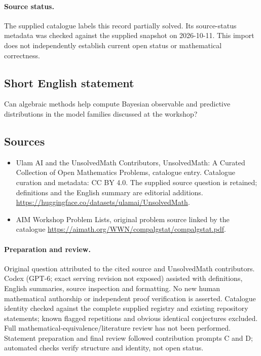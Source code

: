 \documentclass[11pt]{article}
\begin{document}
\paragraph{Source status.}
The supplied catalogue labels this record partially solved. Its source-status metadata was checked against the supplied snapshot on 2026-10-11. This import does not independently establish current open status or mathematical correctness.
\subsection{Short English statement}
Can algebraic methods help compute Bayesian observable and predictive distributions in the model families discussed at the workshop?
\subsection{Sources}
\begin{itemize}
\item[\hypertarget{source:statement:1}{S1}] Ulam AI and the UnsolvedMath Contributors, UnsolvedMath: A Curated Collection of Open Mathematics Problems, catalogue entry. Catalogue curation and metadata: CC BY 4.0. The supplied source question is retained; definitions and the English summary are editorial additions.
\url{https://huggingface.co/datasets/ulamai/UnsolvedMath}.
\item[\hypertarget{source:statement:2}{S2}] AIM Workshop Problem Lists, original problem source linked by the catalogue
\url{https://aimath.org/WWN/compalgstat/compalgstat.pdf}.
\end{itemize}
\paragraph{Preparation and review.}
Original question attributed to the cited source and UnsolvedMath contributors. Codex (GPT-6; exact serving revision not exposed) assisted with definitions, English summaries, source inspection and formatting. No new human mathematical authorship or independent proof verification is asserted. Catalogue identity checked against the complete supplied registry and existing repository statements; known flagged repetitions and obvious identical conjectures excluded. Full mathematical-equivalence/literature review has not been performed. Statement preparation and final review followed contribution prompts C and D; automated checks verify structure and identity, not open status.
\label{end:statement}
\end{document}
